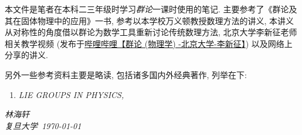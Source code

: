     本文件是笔者在本科二三年级时学习\emph{群论}一课时使用的笔记. 主要参考了《群论及其在固体物理中的应用》\cite{Xu1994}一书, 参考以本学校万义顿教授数理方法的讲义\cite{Wan2024}, 本讲义从对称性的角度借以群论为数学工具重新讨论传统数理方法, 北京大学李新征老师相关教学视频 (发布于\href{https://www.bilibili.com/video/BV1Ux4y177BH?vd_source=d630661fd733349495a9252445d0c4a4}{哔哩哔哩【群论 (物理学) -北京大学-李新征】}) 以及网络上分享的讲义.

    另外一些参考资料主要是略读, 包括诸多国内外经典著作, 列举在下:
    \begin{enumerate}
        \item \textit{LIE GROUPS IN PHYSICS,} 
    \end{enumerate}

    \vspace{2cm}
    \begin{flushright}
        \textit{林海轩} \\[1em]
        \textit{复旦大学\ \today}
    \end{flushright}